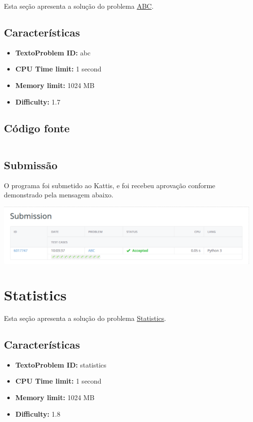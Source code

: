 \documentclass[11pt,a4paper]{scrreprt}
\begin{document}
Esta seção apresenta a solução do problema \href{https://open.kattis.com/problems/abc}{ABC}.

\subsection{Características}

\begin{itemize}
    \item\textbf{TextoProblem ID: } abc
    \item\textbf{CPU Time limit: } 1 second
    \item\textbf{Memory limit: } 1024 MB
    \item\textbf{Difficulty: }  1.7
\end{itemize}

\subsection{Código fonte}

\inputminted[linenos]{python}{src/ABC.py}

\subsection{Submissão}
O programa foi submetido ao Kattis, e foi recebeu aprovação conforme demonstrado pela mensagem abaixo.

\includegraphics[scale=0.47]{img/ABC.png}

\section{Statistics}

Esta seção apresenta a solução do problema \href{https://open.kattis.com/problems/statistics}{Statistics}.

\subsection{Características}

\begin{itemize}
    \item\textbf{TextoProblem ID: } statistics
    \item\textbf{CPU Time limit: } 1 second
    \item\textbf{Memory limit: } 1024 MB
    \item\textbf{Difficulty: }  1.8
\end{itemize}
\end{document}

